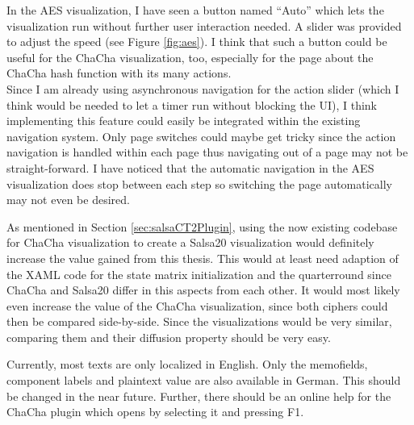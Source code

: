 \begin{description}[style=nextline]
\item[Automatic navigation]

In the AES visualization, I have seen a button named ``Auto'' which lets the visualization run without further user interaction needed. A slider was provided to adjust the speed (see Figure \ref{fig:aes}). I think that such a button could be useful for the ChaCha visualization, too, especially for the page about the ChaCha hash function with its many actions. \\
Since I am already using asynchronous navigation for the action slider (which I think would be needed to let a timer run without blocking the UI), I think implementing this feature could easily be integrated within the existing navigation system. Only page switches could maybe get tricky since the action navigation is handled within each page thus navigating out of a page may not be straight-forward. I have noticed that the automatic navigation in the AES visualization does stop between each step so switching the page automatically may not even be desired.

\item[Salsa20 visualization]

As mentioned in Section \ref{sec:salsaCT2Plugin}, using the now existing codebase for ChaCha visualization to create a Salsa20 visualization would definitely increase the value gained from this thesis. This would at least need adaption of the XAML code for the state matrix initialization and the quarterround since ChaCha and Salsa20 differ in this aspects from each other. It would most likely even increase the value of the ChaCha visualization, since both ciphers could then be compared side-by-side. Since the visualizations would be very similar, comparing them and their diffusion property should be very easy.

\item[Localization and online help]

Currently, most texts are only localized in English. Only the memofields, component labels and plaintext value are also available in German. This should be changed in the near future. Further, there should be an online help for the ChaCha plugin which opens by selecting it and pressing F1.

\end{description}

